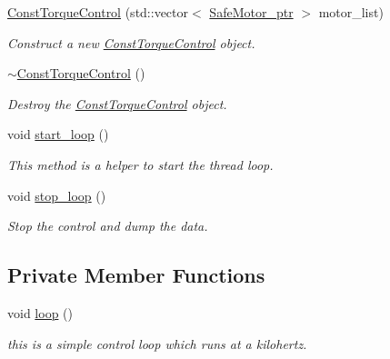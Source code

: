 \begin{DoxyCompactItemize}
\item 
\hyperlink{classblmc__drivers_1_1ConstTorqueControl_a2253fc0273462fa35c21f1424dcc919c}{Const\+Torque\+Control} (std\+::vector$<$ \hyperlink{namespaceblmc__drivers_ab975c3be3c53a93a10c491f07a132e2b}{Safe\+Motor\+\_\+ptr} $>$ motor\+\_\+list)
\begin{DoxyCompactList}\small\item\em Construct a new \hyperlink{classblmc__drivers_1_1ConstTorqueControl}{Const\+Torque\+Control} object. \end{DoxyCompactList}\item 
\hyperlink{classblmc__drivers_1_1ConstTorqueControl_a19dab80ddeb10158d1ad17cdcfd0cc47}{$\sim$\+Const\+Torque\+Control} ()\hypertarget{classblmc__drivers_1_1ConstTorqueControl_a19dab80ddeb10158d1ad17cdcfd0cc47}{}\label{classblmc__drivers_1_1ConstTorqueControl_a19dab80ddeb10158d1ad17cdcfd0cc47}

\begin{DoxyCompactList}\small\item\em Destroy the \hyperlink{classblmc__drivers_1_1ConstTorqueControl}{Const\+Torque\+Control} object. \end{DoxyCompactList}\item 
void \hyperlink{classblmc__drivers_1_1ConstTorqueControl_aa5e7bae477c05904c00f4e843d635c14}{start\+\_\+loop} ()\hypertarget{classblmc__drivers_1_1ConstTorqueControl_aa5e7bae477c05904c00f4e843d635c14}{}\label{classblmc__drivers_1_1ConstTorqueControl_aa5e7bae477c05904c00f4e843d635c14}

\begin{DoxyCompactList}\small\item\em This method is a helper to start the thread loop. \end{DoxyCompactList}\item 
void \hyperlink{classblmc__drivers_1_1ConstTorqueControl_aeb954986cb31a9cb0796f6bee9b22b1a}{stop\+\_\+loop} ()\hypertarget{classblmc__drivers_1_1ConstTorqueControl_aeb954986cb31a9cb0796f6bee9b22b1a}{}\label{classblmc__drivers_1_1ConstTorqueControl_aeb954986cb31a9cb0796f6bee9b22b1a}

\begin{DoxyCompactList}\small\item\em Stop the control and dump the data. \end{DoxyCompactList}\end{DoxyCompactItemize}
\subsection*{Private Member Functions}
\begin{DoxyCompactItemize}
\item 
void \hyperlink{classblmc__drivers_1_1ConstTorqueControl_a82a2bc2327fc6fb6a10a4ae88d01e87f}{loop} ()
\begin{DoxyCompactList}\small\item\em this is a simple control loop which runs at a kilohertz. \end{DoxyCompactList}\end{DoxyCompactItemize}
